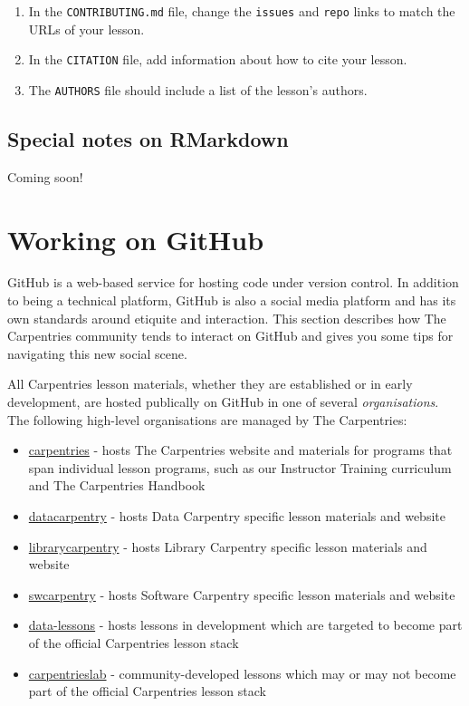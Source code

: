 \documentclass[
]{book}
\providecommand{\tightlist}{%
  \setlength{\itemsep}{0pt}\setlength{\parskip}{0pt}}
\begin{document}
\begin{enumerate}
\def\labelenumi{\arabic{enumi}.}
\item
  In the \texttt{CONTRIBUTING.md} file, change the \texttt{issues} and \texttt{repo} links to match the URLs of your lesson.
\item
  In the \texttt{CITATION} file, add information about how to cite your lesson.
\item
  The \texttt{AUTHORS} file should include a list of the lesson's authors.
\end{enumerate}

\hypertarget{special-notes-on-rmarkdown}{%
\subsection{Special notes on RMarkdown}\label{special-notes-on-rmarkdown}}

Coming soon!

\hypertarget{working-on-github}{%
\section{Working on GitHub}\label{working-on-github}}

GitHub is a web-based service for hosting code under version control. In addition to being a technical
platform, GitHub is also a social media platform and has its own standards around etiquite and interaction. This
section describes how The Carpentries community tends to interact on GitHub and gives you some tips for
navigating this new social scene.

All Carpentries lesson materials, whether they are established or in early development, are hosted publically
on GitHub in one of several \emph{organisations}. The following high-level organisations are managed by The Carpentries:

\begin{itemize}
\tightlist
\item
  \href{https://github.com/carpentries}{carpentries} - hosts The Carpentries website and materials for programs that span individual lesson programs, such as our Instructor Training curriculum and The Carpentries Handbook
\item
  \href{https://github.com/datacarpentry}{datacarpentry} - hosts Data Carpentry specific lesson materials and website
\item
  \href{https://github.com/librarycarpentry}{librarycarpentry} - hosts Library Carpentry specific lesson materials and website
\item
  \href{https://github.com/swcarpentry}{swcarpentry} - hosts Software Carpentry specific lesson materials and website
\item
  \href{https://github.com/data-lessons}{data-lessons} - hosts lessons in development which are targeted to become part of the official Carpentries lesson stack
\item
  \href{http://github.com/carpentrieslab}{carpentrieslab} - community-developed lessons which may or may not become part of the official Carpentries lesson stack
\end{itemize}
\end{document}
